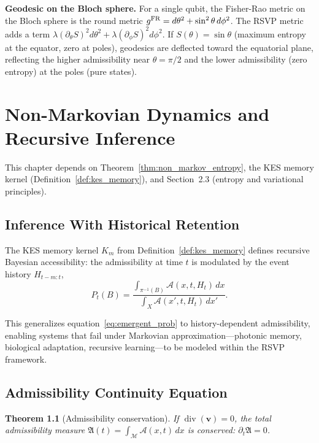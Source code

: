 \documentclass[11pt, openright, twoside]{book}
\theoremstyle{plain}
\newtheorem{theorem}{Theorem}[chapter]
\theoremstyle{definition}
\theoremstyle{remark}
\newcommand{\vfield}{\mathbf{v}}
\newcommand{\Sfield}{S}
\newcommand{\Admiss}{\mathcal{A}}
\newcommand{\Traj}{X}
\newcommand{\proj}{\pi}
\begin{document}
\begin{exbox}
\textbf{Geodesic on the Bloch sphere.} For a single qubit, the Fisher-Rao metric on the
Bloch sphere is the round metric $g^{\rm FR}=d\theta^2+\sin^2\theta\,d\phi^2$. The RSVP
metric adds a term $\lambda(\partial_\theta\Sfield)^2 d\theta^2+\lambda(\partial_\phi\Sfield)^2 d\phi^2$.
If $\Sfield(\theta)=\sin\theta$ (maximum entropy at the equator, zero at poles), geodesics
are deflected toward the equatorial plane, reflecting the higher admissibility near $\theta=\pi/2$
and the lower admissibility (zero entropy) at the poles (pure states).
\end{exbox}

\chapter{Non-Markovian Dynamics and Recursive Inference}

\begin{depbox}
This chapter depends on Theorem~\ref{thm:non_markov_entropy}, the KES memory kernel
(Definition~\ref{def:kes_memory}), and Section~2.3 (entropy and variational principles).
\end{depbox}

\section{Inference With Historical Retention}

The KES memory kernel $K_m$ from Definition~\ref{def:kes_memory} defines recursive Bayesian
accessibility: the admissibility at time $t$ is modulated by the event history $H_{t-m:t}$,
\begin{equation}
  P_t(B) = \frac{\int_{\proj^{-1}(B)}\Admiss(x,t,H_t)\,dx}
  {\int_\Traj\Admiss(x',t,H_t)\,dx'}.
\end{equation}

This generalizes equation~\eqref{eq:emergent_prob} to history-dependent admissibility,
enabling systems that fail under Markovian approximation---photonic memory, biological
adaptation, recursive learning---to be modeled within the RSVP framework.

\section{Admissibility Continuity Equation}

\begin{theorem}[Admissibility conservation]
If $\operatorname{div}(\vfield)=0$, the total admissibility measure
$\mathfrak{A}(t)=\int_\mathcal{M}\Admiss(x,t)\,dx$ is conserved:
$\partial_t\mathfrak{A}=0$.
\end{theorem}
\end{document}
